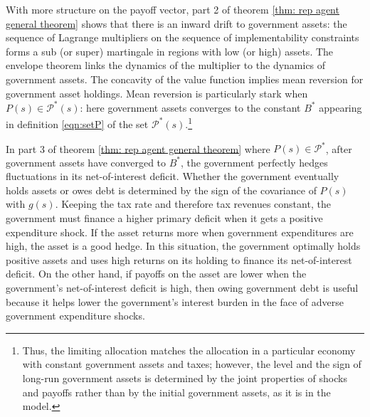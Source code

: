 \documentclass[thmsb,11pt]{article}
\begin{document}
With more structure on the payoff vector, part 2 of  theorem \ref{thm: rep agent general theorem} shows that there is an  inward drift to government assets:
the sequence of Lagrange multipliers on the sequence of implementability constraints forms a sub (or super) martingale in  regions with low (or high) assets.
The envelope theorem links the dynamics of the multiplier to the dynamics  of government assets.  The concavity of the value function implies
mean reversion for government  asset holdings. Mean reversion is particularly stark when $P(s)\in \mathcal{P}^*(s)$: here  government assets converges to
the constant $B^*$ appearing in  definition \eqref{eqn:setP} of the set $\mathcal{P}^*(s)$.\footnote{Thus, the limiting allocation matches the allocation in
a particular \citeauthor{LucasJr.1983} economy  with constant government  assets and taxes; however,
the level and the sign of long-run government assets is determined by the joint properties of shocks and payoffs rather than
by the initial government assets,  as it is in the \citeauthor{LucasJr.1983} model.}



In part 3 of theorem \ref{thm: rep agent general theorem} where  $P(s)\in\mathcal{P}^*$,
after government assets have converged to $B^*$, %
the government perfectly hedges fluctuations in
its net-of-interest deficit.   Whether the government eventually holds assets or owes  debt is determined
by the sign of the covariance of $P(s)$ with $g(s)$.
Keeping the tax rate and therefore tax revenues constant, the government must finance
a higher primary deficit when it gets a positive expenditure shock.
If the asset returns more when government expenditures are high, the asset is a good hedge. In this situation, the government optimally holds positive assets and uses high returns
on its holding to finance its  net-of-interest deficit. On the other hand,  if  payoffs on the asset  are lower  when the
government's net-of-interest deficit is high, then owing government debt is useful because it helps  lower the government's interest burden in the face of adverse government expenditure shocks.

\end{document}

